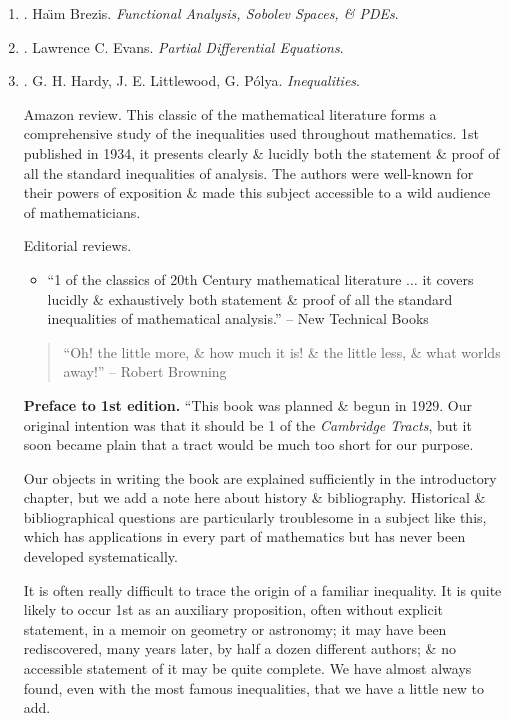 \documentclass{article}
\begin{document}
\begin{enumerate}
	\item \cite{Brezis2011}. Ha\"\i m Brezis. {\it Functional Analysis, Sobolev Spaces, \& PDEs}.\hfill{\sf[reading]}
	
	\item \cite{Evans2010}. Lawrence C. Evans. {\it Partial Differential Equations}.\hfill{\sf[reading]}
	
	\item \cite{Hardy_Littlewood_Polya1952}. {\sc G. H. Hardy, J. E. Littlewood, G. P\'{o}lya}. {\it Inequalities}. {}
	
	{\sf Amazon review.} This classic of the mathematical literature forms a comprehensive study of the inequalities used throughout mathematics. 1st published in 1934, it presents clearly \& lucidly both the statement \& proof of all the standard inequalities of analysis. The authors were well-known for their powers of exposition \& made this subject accessible to a wild audience of mathematicians.
	
	{\sf Editorial reviews.}
	\begin{itemize}
		\item ``1 of the classics of 20th Century mathematical literature $\ldots$ it covers lucidly \& exhaustively both statement \& proof of all the standard inequalities of mathematical analysis.'' -- New Technical Books
	\end{itemize}
	\begin{quote}
		``Oh! the little more, \& how much it is! \& the little less, \& what worlds away!'' -- {\sc Robert Browning}
	\end{quote}
	{\bf Preface to 1st edition.} ``This book was planned \& begun in 1929. Our original intention was that it should be 1 of the {\it Cambridge Tracts}, but it soon became plain that a tract would be much too short for our purpose.
	
	Our objects in writing the book are explained sufficiently in the introductory chapter, but we add a note here about history \& bibliography. Historical \& bibliographical questions are particularly troublesome in a subject like this, which has applications in every part of mathematics but has never been developed systematically.
	
	It is often really difficult to trace the origin of a familiar inequality. It is quite likely to occur 1st as an auxiliary proposition, often without explicit statement, in a memoir on geometry or astronomy; it may have been rediscovered, many years later, by half a dozen different authors; \& no accessible statement of it may be quite complete. We have almost always found, even with the most famous inequalities, that we have a little new to add.
	

\end{enumerate}
\end{document}
